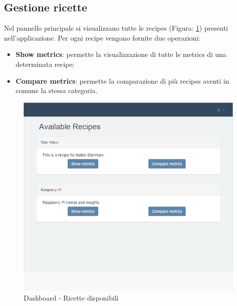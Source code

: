 	\pagebreak
	\subsection{Gestione ricette} %
	\label{sec:gestione_ricette}
		Nel pannello principale si visualizzano tutte le recipes (Figura: \ref{fig:ricette_disponibili}) presenti nell'applicazione.\newline
		Per ogni recipe vengono fornite due operazioni:
		\begin{itemize}
			\item \textbf{Show metrics}: permette la visualizzazione di tutte le metrics di una determinata recipe;
			\item \textbf{Compare metrics}: permette la comparazione di più recipes aventi in comune la stessa categoria.
		\end{itemize}

		\begin{figure}[H]
			\centering
			\centerline{\includegraphics[width=14cm]{images/ricette_disponibili.png}}
			\caption{Dashboard - Ricette disponibili}
			\label{fig:ricette_disponibili}
		\end{figure}


		\pagebreak
